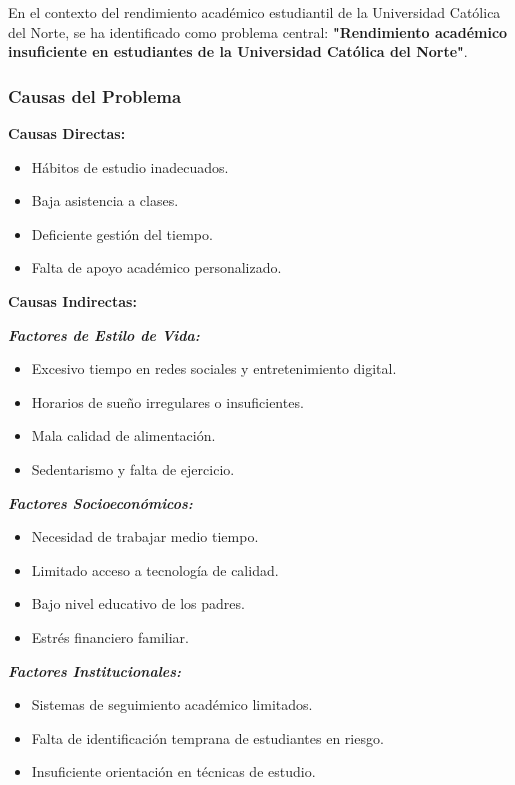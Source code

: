 \documentclass[12pt,letterpaper]{report}
\begin{document}
En el contexto del rendimiento académico estudiantil de la Universidad Católica del Norte, se ha identificado como problema central: \textbf{"Rendimiento académico insuficiente en estudiantes de la Universidad Católica del Norte"}.

\subsubsection{Causas del Problema}

\textbf{Causas Directas:}
\begin{itemize}
    \item Hábitos de estudio inadecuados.
    \item Baja asistencia a clases.
    \item Deficiente gestión del tiempo.
    \item Falta de apoyo académico personalizado.
\end{itemize}

\textbf{Causas Indirectas:}

\textbf{\textit{Factores de Estilo de Vida:}}
\vspace{0.1cm}
\begin{itemize}
    \item Excesivo tiempo en redes sociales y entretenimiento digital.
    \item Horarios de sueño irregulares o insuficientes.
    \item Mala calidad de alimentación.
    \item Sedentarismo y falta de ejercicio.
\end{itemize}

\textbf{\textit{Factores Socioeconómicos:}}
\vspace{0.1cm}
\begin{itemize}
    \item Necesidad de trabajar medio tiempo.
    \item Limitado acceso a tecnología de calidad.
    \item Bajo nivel educativo de los padres.
    \item Estrés financiero familiar.
\end{itemize}

\textbf{\textit{Factores Institucionales:}}
\vspace{0.1cm}
\begin{itemize}
    \item Sistemas de seguimiento académico limitados.
    \item Falta de identificación temprana de estudiantes en riesgo.
    \item Insuficiente orientación en técnicas de estudio.
\end{itemize}
\end{document}
